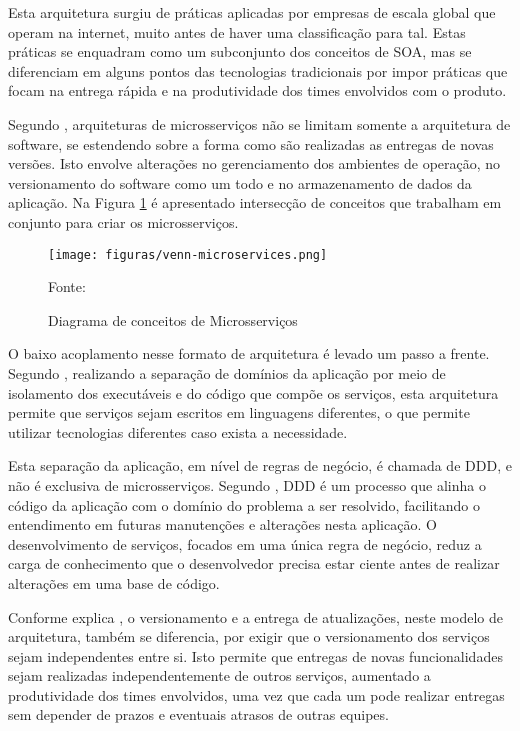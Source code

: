 Esta arquitetura surgiu de práticas aplicadas por empresas de escala global que
operam na internet, muito antes de haver uma classificação para tal. Estas
práticas se enquadram como um subconjunto dos conceitos de \ac{SOA}, mas se
diferenciam em alguns pontos das tecnologias tradicionais por impor práticas
que focam na entrega rápida e na produtividade dos times envolvidos com
o produto.

Segundo , arquiteturas de microsserviços não se limitam
somente a arquitetura de software, se estendendo sobre a forma como são
realizadas as entregas de novas versões. Isto envolve alterações no
gerenciamento dos ambientes de operação, no versionamento do software como um
todo e no armazenamento de dados da aplicação. Na Figura
\ref{fig:venn-microservices} é apresentado intersecção de conceitos que
trabalham em conjunto para criar os microsserviços.

\begin{figure}[H]
	\centering
	\caption{Diagrama de conceitos de Microsserviços}
	\texttt{[image: figuras/venn-microservices.png]}

	\label{fig:venn-microservices}
	\footnotesize Fonte: 
\end{figure}

O baixo acoplamento nesse formato de arquitetura é levado um passo a frente.
Segundo , realizando a separação de domínios da
aplicação por meio de isolamento dos executáveis e do código que compõe os
serviços, esta arquitetura permite que serviços sejam escritos em linguagens
diferentes, o que permite utilizar tecnologias diferentes caso exista
a necessidade.

Esta separação da aplicação, em nível de regras de negócio, é chamada
de \ac{DDD}, e não é exclusiva de microsserviços. Segundo
, \ac{DDD} é um processo que alinha o
código da aplicação com o domínio do problema a ser resolvido,
facilitando o entendimento em futuras manutenções e alterações nesta
aplicação. O desenvolvimento de serviços, focados em uma única regra de
negócio, reduz a carga de conhecimento que o desenvolvedor precisa estar
ciente antes de realizar alterações em uma base de código.

Conforme explica , o versionamento e a entrega de
atualizações, neste modelo de arquitetura, também se diferencia, por exigir
que o versionamento dos serviços sejam independentes entre si. Isto permite
que entregas de novas funcionalidades sejam realizadas independentemente de
outros serviços, aumentado a produtividade dos times envolvidos, uma vez que
cada um pode realizar entregas sem depender de prazos e eventuais atrasos
de outras equipes.

